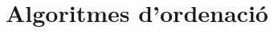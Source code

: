 \documentclass[a4paper, 12pt]{article}
\begin{document}
    \section{Algoritmes d'ordenaci\'o}
\end{document}
